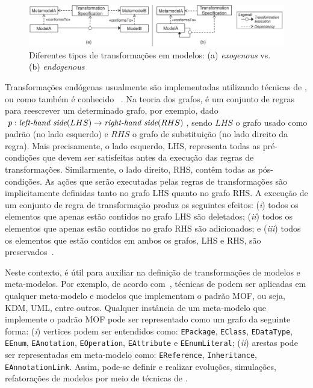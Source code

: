 \begin{figure}[htb]
 \caption{Diferentes tipos de transformações em modelos: (a) \emph{exogenous}  vs. (b) \emph{endogenous} }
 \label{fig:model_transformations}
 \centering
 \includegraphics[scale=0.45]{images/transformacoes.png}
\end{figure}

Transformações endógenas usualmente são implementadas utilizando técnicas de , ou como também é conhecido ~\cite{Ehrig_2006}. Na teoria dos grafos,  é um conjunto de regras para reescrever um determinado grafo, por exemplo, dado $p: \emph{left-hand side} (LHS) \rightarrow \emph{right-hand side} (RHS)$, sendo $LHS$ o grafo usado como padrão (no lado esquerdo) e $RHS$ o grafo de substituição (no lado direito da regra). Mais precisamente, o lado esquerdo, LHS, representa todas as pré-condições que devem ser satisfeitas antes da execução das regras de transformações. Similarmente, o lado direito, RHS, contêm todas as pós-condições. As ações que serão executadas pelas regras de transformações são implicitamente definidas tanto no grafo LHS quanto no grafo RHS. A execução de um conjunto de regra de transformação produz os seguintes efeitos: (\textit{i}) todos os elementos que apenas estão contidos no grafo LHS são deletados; (\textit{ii}) todos os elementos que apenas estão contidos no grafo RHS são adicionados; e (\textit{iii}) todos os elementos que estão contidos em ambos os grafos, LHS e RHS, são preservados~\cite{Ehrig_2006}. 

Neste contexto,  é útil para auxiliar na definição de transformações de modelos e meta-modelos. Por exemplo, de acordo com~, técnicas de  podem ser aplicadas em qualquer meta-modelo e modelos que implementam o padrão MOF, ou seja, KDM, UML, entre outros. Qualquer instância de um meta-modelo que implemente o padrão MOF pode ser representado como um grafo da seguinte forma: (\textit{i}) vertices podem ser entendidos como: \texttt{EPackage}, \texttt{EClass}, \texttt{EDataType}, \texttt{EEnum}, \texttt{EAnotation}, \texttt{EOperation}, \texttt{EAttribute} e \texttt{EEnumLiteral}; (\textit{ii}) arestas pode ser representadas em meta-modelo como: \texttt{EReference}, \texttt{Inheritance}, \texttt{EAnnotationLink}. Assim, pode-se definir e realizar evoluções, simulações, refatorações de modelos por meio de técnicas de . 

